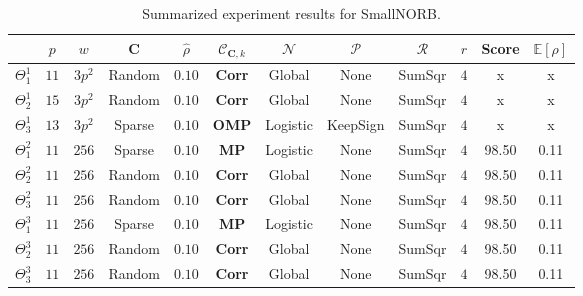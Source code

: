 \documentclass[12pt,a4paper,oneside,english]{UPBThesis}
\begin{document}
\renewcommand{\arraystretch}{1.2}
\begin{table}
  \caption{Summarized experiment results for SmallNORB.}
  \label{table:RecoderEvNORBSmallResultsSummarized}
  \begin{tabularx}{\textwidth}{|R|ccccccccccc|}
    \hline
    & $p$ & $w$ & $\textbf{C}$ & $\hat{\rho}$ & $\mathcal{C}_{\textbf{C},k}$ & $\mathcal{N}$ & $\mathcal{P}$ & $\mathcal{R}$ & $r$ & Score & $\mathbb{E}[\rho]$ \tabularnewline\hline\hline
    $\Theta_1^1$ & $11$ & $3p^2$ & Random & $0.10$ & \textbf{Corr} & Global & None & SumSqr & $4$ & x & x \tabularnewline
    $\Theta_2^1$ & $15$ & $3p^2$ & Random & $0.10$ & \textbf{Corr} & Global & None & SumSqr & $4$ & x & x \tabularnewline
    $\Theta_3^1$ & $13$ & $3p^2$ & Sparse & $0.10$ & \textbf{OMP} & Logistic & KeepSign & SumSqr & $4$ & x & x \tabularnewline\hline\hline
    $\Theta_1^2$ & $11$ & $256$ & Sparse & $0.10$ & \textbf{MP} & Logistic & None & SumSqr & $4$ & 98.50 & 0.11 \tabularnewline
    $\Theta_2^2$ & $11$ & $256$ & Random & $0.10$ & \textbf{Corr} & Global & None & SumSqr & $4$ & 98.50 & 0.11 \tabularnewline
    $\Theta_3^2$ & $11$ & $256$ & Random & $0.10$ & \textbf{Corr} & Global & None & SumSqr & $4$ & 98.50 & 0.11 \tabularnewline\hline\hline
    $\Theta_1^3$ & $11$ & $256$ & Sparse & $0.10$ & \textbf{MP} & Logistic & None & SumSqr & $4$ & 98.50 & 0.11 \tabularnewline
    $\Theta_2^3$ & $11$ & $256$ & Random & $0.10$ & \textbf{Corr} & Global & None & SumSqr & $4$ & 98.50 & 0.11 \tabularnewline
    $\Theta_3^3$ & $11$ & $256$ & Random & $0.10$ & \textbf{Corr} & Global & None & SumSqr & $4$ & 98.50 & 0.11 \tabularnewline
    \hline
  \end{tabularx}
\end{table}
\renewcommand{\arraystretch}{1.0}
\end{document}
